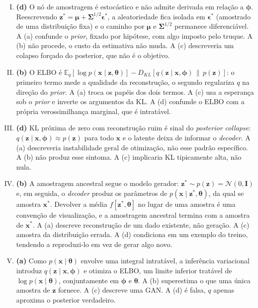 \documentclass{dlproblemset}
\newcommand{\thetav}{\boldsymbol{\theta}}
\begin{document}
\begin{enumerate}[I)]
    \item \textbf{(d)} O nó de amostragem é estocástico e não admite derivada em relação a $\boldsymbol{\phi}$. Reescrevendo $\mathbf{z}^{*} = \boldsymbol{\mu} + \boldsymbol{\Sigma}^{1/2}\boldsymbol{\epsilon}^{*}$, a aleatoriedade fica isolada em $\boldsymbol{\epsilon}^{*}$ (amostrado de uma distribuição fixa) e o caminho por $\boldsymbol{\mu}$ e $\boldsymbol{\Sigma}^{1/2}$ permanece diferenciável. A (a) confunde o \textit{prior}, fixado por hipótese, com algo imposto pelo truque. A (b) não procede, o custo da estimativa não muda. A (c) descreveria um colapso forçado do posterior, que não é o objetivo.

    \item \textbf{(b)} O ELBO é $\mathbb{E}_{q}[\log p(\mathbf{x} \mid \mathbf{z}, \thetav)] - D_{KL}\!\left[q(\mathbf{z} \mid \mathbf{x}, \boldsymbol{\phi})\,\|\,p(\mathbf{z})\right]$: o primeiro termo mede a qualidade da reconstrução, o segundo regulariza $q$ na direção do \textit{prior}. A (a) troca os papéis dos dois termos. A (c) usa a esperança sob o \textit{prior} e inverte os argumentos da KL. A (d) confunde o ELBO com a própria verossimilhança marginal, que é intratável.

    \item \textbf{(d)} KL próxima de zero com reconstrução ruim é sinal do \textit{posterior collapse}: $q(\mathbf{z} \mid \mathbf{x}, \boldsymbol{\phi}) \approx p(\mathbf{z})$ para todo $\mathbf{x}$ e o latente deixa de informar o \textit{decoder}. A (a) descreveria instabilidade geral de otimização, não esse padrão específico. A (b) não produz esse sintoma. A (c) implicaria KL tipicamente alta, não nula.

    \item \textbf{(b)} A amostragem ancestral segue o modelo gerador: $\mathbf{z}^{*} \sim p(\mathbf{z}) = \mathcal{N}(0, \mathbf{I})$ e, em seguida, o \textit{decoder} produz os parâmetros de $p(\mathbf{x} \mid \mathbf{z}^{*}, \thetav)$, da qual se amostra $\mathbf{x}^{*}$. Devolver a média $f[\mathbf{z}^{*},\thetav]$ no lugar de uma amostra é uma convenção de visualização, e a amostragem ancestral termina com a amostra de $\mathbf{x}^{*}$. A (a) descreve reconstrução de um dado existente, não geração. A (c) amostra da distribuição errada. A (d) condiciona em um exemplo do treino, tendendo a reproduzi-lo em vez de gerar algo novo.

    \item \textbf{(a)} Como $p(\mathbf{x} \mid \thetav)$ envolve uma integral intratável, a inferência variacional introduz $q(\mathbf{z} \mid \mathbf{x}, \boldsymbol{\phi})$ e otimiza o ELBO, um limite inferior tratável de $\log p(\mathbf{x} \mid \thetav)$, conjuntamente em $\boldsymbol{\phi}$ e $\thetav$. A (b) superestima o que uma única amostra de $\mathbf{z}$ fornece. A (c) descreve uma GAN. A (d) é falsa, $q$ apenas aproxima o posterior verdadeiro.


\end{enumerate}
\end{document}
